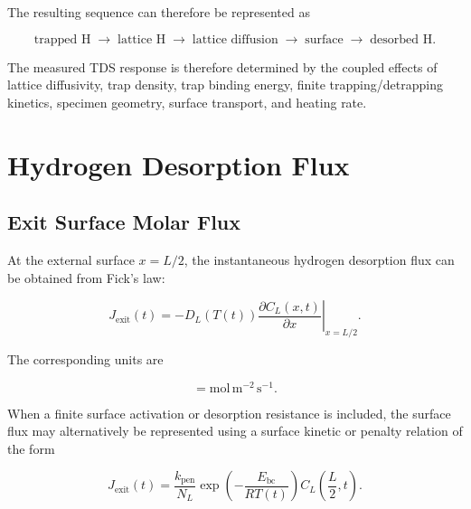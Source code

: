 The resulting sequence can therefore be represented as

\begin{equation}
\text{trapped H}
\;\longrightarrow\;
\text{lattice H}
\;\longrightarrow\;
\text{lattice diffusion}
\;\longrightarrow\;
\text{surface}
\;\longrightarrow\;
\text{desorbed H}.
\label{eq:ch3_desorption_sequence}
\end{equation}

The measured TDS response is therefore determined by the coupled
effects of lattice diffusivity, trap density, trap binding energy,
finite trapping/detrapping kinetics, specimen geometry, surface
transport, and heating rate.

\section{Hydrogen Desorption Flux}
\label{sec:desorption_flux}

\subsection{Exit Surface Molar Flux}
\label{subsec:exit_flux}

At the external surface $x=L/2$, the instantaneous hydrogen desorption
flux can be obtained from Fick's law:

\begin{equation}
J_{\mathrm{exit}}(t)
=
-\left.
D_L(T(t))
\frac{\partial C_L(x,t)}{\partial x}
\right|_{x=L/2}.
\label{eq:ch3_surface_flux_fick}
\end{equation}

The corresponding units are

\begin{equation}
[J_{\mathrm{exit}}]
=
\mathrm{mol\,m^{-2}\,s^{-1}}.
\end{equation}

When a finite surface activation or desorption resistance is included,
the surface flux may alternatively be represented using a surface
kinetic or penalty relation of the form

\begin{equation}
J_{\mathrm{exit}}(t)
=
\frac{k_{\mathrm{pen}}}{N_L}
\exp\left(
-\frac{E_{\mathrm{bc}}}{RT(t)}
\right)
C_L\left(\frac{L}{2},t\right).
\label{eq:ch3_surface_flux_penalty}
\end{equation}


